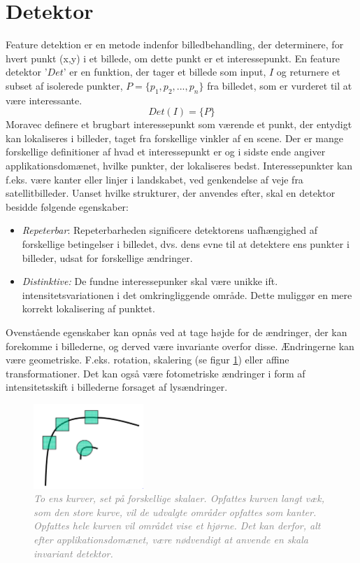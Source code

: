 \section{Detektor}\label{sec:detect}
Feature detektion er en metode indenfor billedbehandling, der determinere, for hvert punkt (x,y) i et billede, om dette punkt er et interessepunkt.  En feature detektor '$Det$' er en funktion, der tager et billede som input, $I$ og returnere et subset af isolerede punkter, $P= \lbrace p_1,p_2,...,p_n\rbrace$ fra billedet, som er vurderet til at være interessante. 
$$ Det(I)=\lbrace P \rbrace$$
Moravec \cite{moravec} definere et brugbart interessepunkt som værende et punkt, der entydigt kan lokaliseres i billeder, taget fra forskellige vinkler af en scene. Der er mange forskellige definitioner af hvad et interessepunkt er og i sidste ende angiver applikationsdomænet, hvilke punkter, der lokaliseres bedst. Interessepunkter kan f.eks. være kanter eller linjer i landskabet, ved genkendelse af veje fra satellitbilleder. Uanset hvilke strukturer, der anvendes efter, skal en detektor besidde følgende egenskaber:
\begin{itemize}
\item{\emph{Repeterbar}: Repeterbarheden significere detektorens uafhængighed af forskellige betingelser i billedet, dvs. dens evne til at detektere ens punkter i billeder, udsat for forskellige ændringer. }
\item{\emph{Distinktive:}
De fundne interessepunker skal være unikke ift. intensitetsvariationen i det omkringliggende område. Dette muliggør en mere korrekt lokalisering af punktet.}
\end{itemize}
Ovenstående egenskaber kan opnås ved at tage højde for de ændringer, der kan forekomme i billederne, og derved være invariante overfor disse. Ændringerne kan være geometriske. F.eks. rotation, skalering (se figur \ref{fig:skal}) eller affine transformationer. Det kan også være fotometriske ændringer i form af intensitetsskift i billederne forsaget af lysændringer.
\begin{figure}[H]
    \centering
    \includegraphics[width=0.37\textwidth]{fig/28.png}
     \vspace{-1em}
    \begin{center}    
       \caption{\textcolor{gray}{\footnotesize \textit{To ens kurver, set på forskellige skalaer. Opfattes kurven langt væk, som den store kurve, vil de udvalgte områder opfattes som kanter. Opfattes hele kurven vil området vise et hjørne. Det kan derfor, alt efter applikationsdomænet, være nødvendigt at anvende en skala invariant detektor.}}}
    \label{fig:skal}
     \end{center}
     \vspace{-2.5em}
  \end{figure} \noindent
